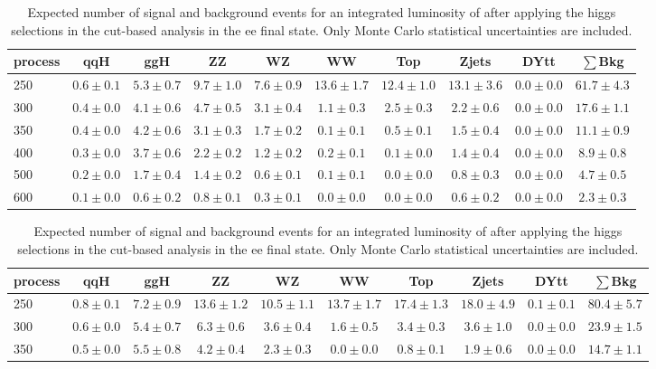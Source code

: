 \begin{table}
{\footnotesize
 \begin{center}
 \begin{tabular}{l | c c | c c c c c c c }
 \hline
 process & qqH & ggH & ZZ & WZ & WW & Top & Zjets & DYtt & $\sum$Bkg \\
 \hline
250 & $0.6\pm0.1$ & $5.3\pm0.7$ & $9.7\pm1.0$ & $7.6\pm0.9$ & $13.6\pm1.7$ & $12.4\pm1.0$ & $13.1\pm3.6$ & $0.0\pm0.0$ & $61.7\pm4.3$ \\
300 & $0.4\pm0.0$ & $4.1\pm0.6$ & $4.7\pm0.5$ & $3.1\pm0.4$ & $1.1\pm0.3$ & $2.5\pm0.3$ & $2.2\pm0.6$ & $0.0\pm0.0$ & $17.6\pm1.1$ \\
350 & $0.4\pm0.0$ & $4.2\pm0.6$ & $3.1\pm0.3$ & $1.7\pm0.2$ & $0.1\pm0.1$ & $0.5\pm0.1$ & $1.5\pm0.4$ & $0.0\pm0.0$ & $11.1\pm0.9$ \\
400 & $0.3\pm0.0$ & $3.7\pm0.6$ & $2.2\pm0.2$ & $1.2\pm0.2$ & $0.2\pm0.1$ & $0.1\pm0.0$ & $1.4\pm0.4$ & $0.0\pm0.0$ & $8.9\pm0.8$ \\
500 & $0.2\pm0.0$ & $1.7\pm0.4$ & $1.4\pm0.2$ & $0.6\pm0.1$ & $0.1\pm0.1$ & $0.0\pm0.0$ & $0.8\pm0.3$ & $0.0\pm0.0$ & $4.7\pm0.5$ \\
600 & $0.1\pm0.0$ & $0.6\pm0.2$ & $0.8\pm0.1$ & $0.3\pm0.1$ & $0.0\pm0.0$ & $0.0\pm0.0$ & $0.6\pm0.2$ & $0.0\pm0.0$ & $2.3\pm0.3$ \\
\hline
\end{tabular}
\end{center}
\label{tab:yield_cutbased_ee}
}
\caption{Expected number of signal and background events for an 
  integrated luminosity of \intlumi after applying the higgs selections in the cut-based analysis in the ee final state. 
  Only Monte Carlo statistical uncertainties are included. }
{\footnotesize
 \begin{center}
 \begin{tabular}{l | c c |  c c c c c c c }
 \hline
 process & qqH & ggH & ZZ & WZ & WW & Top & Zjets & DYtt & $\sum$Bkg \\
 \hline
250 & $0.8\pm0.1$ & $7.2\pm0.9$ & $13.6\pm1.2$ & $10.5\pm1.1$ & $13.7\pm1.7$ & $17.4\pm1.3$ & $18.0\pm4.9$ & $0.1\pm0.1$ & $80.4\pm5.7$ \\
300 & $0.6\pm0.0$ & $5.4\pm0.7$ & $6.3\pm0.6$ & $3.6\pm0.4$ & $1.6\pm0.5$ & $3.4\pm0.3$ & $3.6\pm1.0$ & $0.0\pm0.0$ & $23.9\pm1.5$ \\
350 & $0.5\pm0.0$ & $5.5\pm0.8$ & $4.2\pm0.4$ & $2.3\pm0.3$ & $0.0\pm0.0$ & $0.8\pm0.1$ & $1.9\pm0.6$ & $0.0\pm0.0$ & $14.7\pm1.1$ \\

\end{tabular}
\end{center}}
\end{table}
